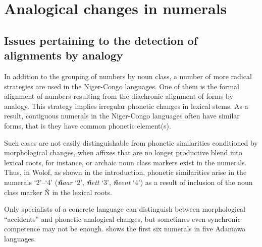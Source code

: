 \chapter{Analogical changes in numerals} 
\section{Issues pertaining to the detection of alignments by analogy}

In addition to the grouping of numbers by noun class, a number of more radical strategies are used in the Niger-Congo languages. One of them is the formal alignment of numbers resulting from the diachronic alignment of forms by analogy. This strategy implies irregular phonetic changes in lexical stems. As a result, contiguous numerals in the Niger-Congo languages often have similar forms, that is they have common phonetic element(s). 

Such cases are not easily distinguishable from phonetic similarities conditioned by morphological changes, when affixes that are no longer productive blend into lexical roots, for instance, or archaic noun class markers exist in the numerals. Thus, in Wolof, as shown in the introduction, phonetic similarities arise in the numerals `2'–`4' (\textbf{\textit{ñ}}\textit{aar} ‘2’, \textbf{\textit{ñ}}\textit{ett} ‘3’, \textbf{\textit{ñ}}\textit{eent} ‘4’) as a result of inclusion of the noun class marker Ñ in the lexical roots. 

Only specialists of a concrete language can distinguish between morphological “accidents” and phonetic analogical changes, but sometimes even synchronic competence may not be enough.  shows the first six numerals in five Adamawa languages.


\begin{table}
\caption{\label{tab:2:1}Adamawa examples}
\end{table}


